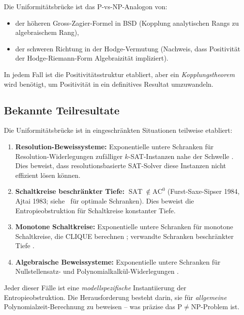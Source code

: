 \documentclass[aps,prd,twocolumn,superscriptaddress,nofootinbib]{revtex4-2}
\theoremstyle{definition}
\theoremstyle{remark}
\DeclareMathOperator{\SAT}{SAT}
\newcommand{\NP}{\mathrm{NP}}
\newcommand{\PP}{\mathrm{P}}
\begin{document}
Die Uniformitätsbrücke ist das $\PP$-vs-$\NP$-Analogon von:
\begin{itemize}
\item der \glqq höheren Gross-Zagier-Formel\grqq{} in BSD (Kopplung analytischen Rangs zu algebraischem Rang),
\item der \glqq schweren Richtung\grqq{} in der Hodge-Vermutung (Nachweis, dass Positivität der Hodge-Riemann-Form Algebraizität impliziert).
\end{itemize}

In jedem Fall ist die Positivitätsstruktur etabliert, aber ein \textit{Kopplungstheorem} wird benötigt, um Positivität in ein definitives Resultat umzuwandeln.

\subsection{Bekannte Teilresultate}

Die Uniformitätsbrücke ist in eingeschränkten Situationen teilweise etabliert:

\begin{enumerate}
\item \textbf{Resolution-Beweissysteme:} Exponentielle untere Schranken für Resolution-Widerlegungen zufälliger $k$-SAT-Instanzen nahe der Schwelle \cite{BenSasson2001}. Dies beweist, dass resolutionsbasierte SAT-Solver diese Instanzen nicht effizient lösen können.

\item \textbf{Schaltkreise beschränkter Tiefe:} $\SAT \notin \mathrm{AC}^0$ (Furst-Saxe-Sipser 1984, Ajtai 1983; siehe~\cite{Hastad1987} für optimale Schranken). Dies beweist die Entropieobstruktion für Schaltkreise konstanter Tiefe.

\item \textbf{Monotone Schaltkreise:} Exponentielle untere Schranken für monotone Schaltkreise, die CLIQUE berechnen \cite{Razborov1985}; verwandte Schranken beschränkter Tiefe \cite{Razborov1987}.

\item \textbf{Algebraische Beweissysteme:} Exponentielle untere Schranken für Nullstellensatz- und Polynomialkalkül-Widerlegungen \cite{Grigoriev2001}.
\end{enumerate}

Jeder dieser Fälle ist eine \textit{modellspezifische} Instantiierung der Entropieobstruktion. Die Herausforderung besteht darin, sie für \textit{allgemeine} Polynomialzeit-Berechnung zu beweisen -- was präzise das $\PP \neq \NP$-Problem ist.
\end{document}
